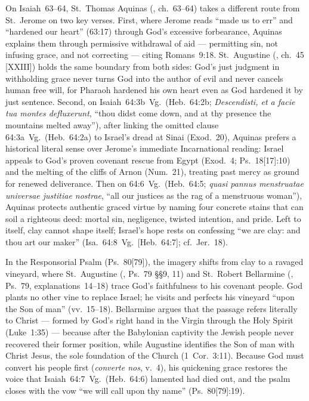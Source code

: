 On Isaiah~63--64, St.~Thomas Aquinas (, ch.~63--64) takes a different route from St.~Jerome on two key verses. First, where Jerome reads ``made us to err'' and ``hardened our heart'' (63:17) through God's excessive forbearance, Aquinas explains them through permissive withdrawal of aid --- permitting sin, not infusing grace, and not correcting --- citing Romans~9:18. St.~Augustine (, ch.~45 [XXIII]) holds the same boundary from both sides: God's just judgment in withholding grace never turns God into the author of evil and never cancels human free will, for Pharaoh hardened his own heart even as God hardened it by just sentence. Second, on Isaiah~64:3b~Vg.\ (Heb.~64:2b; \emph{Descendisti, et a facie tua montes defluxerunt}, ``thou didst come down, and at thy presence the mountains melted away''), after linking the omitted clause 64:3a~Vg.\ (Heb.~64:2a) to Israel's dread at Sinai (Exod.~20), Aquinas prefers a historical literal sense over Jerome's immediate Incarnational reading: Israel appeals to God's proven covenant rescue from Egypt (Exod.~4; Ps.~18[17]:10) and the melting of the cliffs of Arnon (Num.~21), treating past mercy as ground for renewed deliverance. Then on 64:6~Vg.\ (Heb.~64:5; \emph{quasi pannus menstruatae universae justitiae nostrae}, ``all our justices as the rag of a menstruous woman''), Aquinas protects authentic graced virtue by naming four concrete stains that can soil a righteous deed: mortal sin, negligence, twisted intention, and pride. Left to itself, clay cannot shape itself; Israel's hope rests on confessing ``we are clay: and thou art our maker'' (Isa.~64:8~Vg.\ [Heb.~64:7]; cf.\ Jer.~18).

In the Responsorial Psalm (Ps.~80[79]), the imagery shifts from clay to a ravaged vineyard, where St.~Augustine (, Ps.~79 §§9, 11) and St.~Robert Bellarmine (, Ps.~79, explanations~14--18) trace God's faithfulness to his covenant people. God plants no other vine to replace Israel; he visits and perfects his vineyard ``upon the Son of man'' (vv.~15--18). Bellarmine argues that the passage refers literally to Christ --- formed by God's right hand in the Virgin through the Holy Spirit (Luke~1:35) --- because after the Babylonian captivity the Jewish people never recovered their former position, while Augustine identifies the Son of man with Christ Jesus, the sole foundation of the Church (1~Cor.~3:11). Because God must convert his people first (\emph{converte nos}, v.~4), his quickening grace restores the voice that Isaiah~64:7~Vg.\ (Heb.~64:6) lamented had died out, and the psalm closes with the vow ``we will call upon thy name'' (Ps.~80[79]:19).

